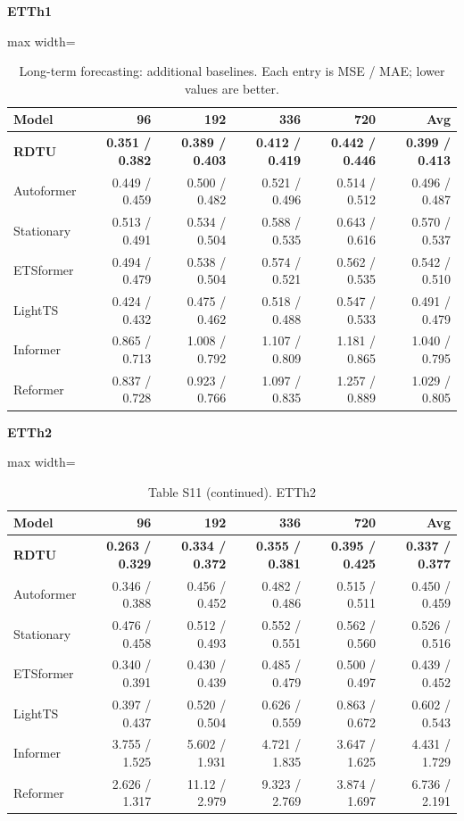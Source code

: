 \begin{table}[H]\centering\small
\caption{Long-term forecasting: additional baselines. Each entry is MSE / MAE; lower values are better.}\label{tab:long-term-forecasting-additional}
\textbf{ETTh1}\par\smallskip
\begin{adjustbox}{max width=\linewidth}\begin{tabular}{lrrrrr}\toprule
\textbf{Model} & \textbf{96} & \textbf{192} & \textbf{336} & \textbf{720} & \textbf{Avg}\\\midrule
\rowcolor{blue!5}
\textbf{RDTU} & \textbf{0.351 / 0.382} & \textbf{0.389 / 0.403} & \textbf{0.412 / 0.419} & \textbf{0.442 / 0.446} & \textbf{0.399 / 0.413}\\
Autoformer & 0.449 / 0.459 & 0.500 / 0.482 & 0.521 / 0.496 & 0.514 / 0.512 & 0.496 / 0.487\\
Stationary & 0.513 / 0.491 & 0.534 / 0.504 & 0.588 / 0.535 & 0.643 / 0.616 & 0.570 / 0.537\\
ETSformer & 0.494 / 0.479 & 0.538 / 0.504 & 0.574 / 0.521 & 0.562 / 0.535 & 0.542 / 0.510\\
LightTS & 0.424 / 0.432 & 0.475 / 0.462 & 0.518 / 0.488 & 0.547 / 0.533 & 0.491 / 0.479\\
Informer & 0.865 / 0.713 & 1.008 / 0.792 & 1.107 / 0.809 & 1.181 / 0.865 & 1.040 / 0.795\\
Reformer & 0.837 / 0.728 & 0.923 / 0.766 & 1.097 / 0.835 & 1.257 / 0.889 & 1.029 / 0.805\\
\bottomrule\end{tabular}\end{adjustbox}\end{table}
\begin{table}[H]\centering\small
\caption*{Table S11 (continued). ETTh2}
\textbf{ETTh2}\par\smallskip
\begin{adjustbox}{max width=\linewidth}\begin{tabular}{lrrrrr}\toprule
\textbf{Model} & \textbf{96} & \textbf{192} & \textbf{336} & \textbf{720} & \textbf{Avg}\\\midrule
\rowcolor{blue!5}
\textbf{RDTU} & \textbf{0.263 / 0.329} & \textbf{0.334 / 0.372} & \textbf{0.355 / 0.381} & \textbf{0.395 / 0.425} & \textbf{0.337 / 0.377}\\
Autoformer & 0.346 / 0.388 & 0.456 / 0.452 & 0.482 / 0.486 & 0.515 / 0.511 & 0.450 / 0.459\\
Stationary & 0.476 / 0.458 & 0.512 / 0.493 & 0.552 / 0.551 & 0.562 / 0.560 & 0.526 / 0.516\\
ETSformer & 0.340 / 0.391 & 0.430 / 0.439 & 0.485 / 0.479 & 0.500 / 0.497 & 0.439 / 0.452\\
LightTS & 0.397 / 0.437 & 0.520 / 0.504 & 0.626 / 0.559 & 0.863 / 0.672 & 0.602 / 0.543\\
Informer & 3.755 / 1.525 & 5.602 / 1.931 & 4.721 / 1.835 & 3.647 / 1.625 & 4.431 / 1.729\\
Reformer & 2.626 / 1.317 & 11.12 / 2.979 & 9.323 / 2.769 & 3.874 / 1.697 & 6.736 / 2.191\\
\bottomrule\end{tabular}\end{adjustbox}\end{table}
